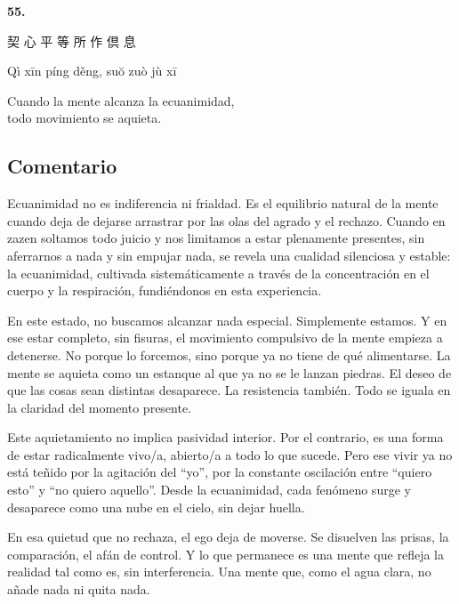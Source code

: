 \documentclass[
  a5paperpaper,
]{article}
\begin{document}
\hfill\break

\hypertarget{05}{}
\begin{verseblock}

\newpage

\begin{center}\textbf{55.}\end{center}

契 心 平 等 所 作 倶 息

Qì xīn píng děng, suŏ zuò jù xī

Cuando la mente alcanza la ecuanimidad,\\
todo movimiento se aquieta.

\end{verseblock}

\hfill\break

\hypertarget{comentario-54}{%
\subsection{Comentario}\label{comentario-54}}

Ecuanimidad no es indiferencia ni frialdad. Es el equilibrio natural de
la mente cuando deja de dejarse arrastrar por las olas del agrado y el
rechazo. Cuando en zazen soltamos todo juicio y nos limitamos a estar
plenamente presentes, sin aferrarnos a nada y sin empujar nada, se
revela una cualidad silenciosa y estable: la ecuanimidad, cultivada
sistemáticamente a través de la concentración en el cuerpo y la
respiración, fundiéndonos en esta experiencia.

En este estado, no buscamos alcanzar nada especial. Simplemente estamos.
Y en ese estar completo, sin fisuras, el movimiento compulsivo de la
mente empieza a detenerse. No porque lo forcemos, sino porque ya no
tiene de qué alimentarse. La mente se aquieta como un estanque al que ya
no se le lanzan piedras. El deseo de que las cosas sean distintas
desaparece. La resistencia también. Todo se iguala en la claridad del
momento presente.

Este aquietamiento no implica pasividad interior. Por el contrario, es
una forma de estar radicalmente vivo/a, abierto/a a todo lo que sucede.
Pero ese vivir ya no está teñido por la agitación del ``yo'', por la
constante oscilación entre ``quiero esto'' y ``no quiero aquello''.
Desde la ecuanimidad, cada fenómeno surge y desaparece como una nube en
el cielo, sin dejar huella.

En esa quietud que no rechaza, el ego deja de moverse. Se disuelven las
prisas, la comparación, el afán de control. Y lo que permanece es una
mente que refleja la realidad tal como es, sin interferencia. Una mente
que, como el agua clara, no añade nada ni quita nada.
\end{document}
